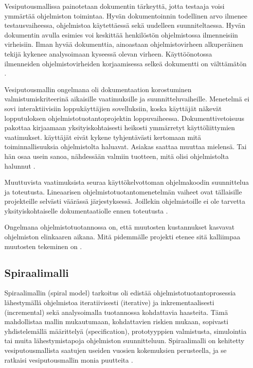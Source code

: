 \documentclass[finnish]{tktltiki2}
\theoremstyle{definition}
\theoremstyle{remark}
\begin{document}
Vesiputousmallissa painotetaan dokumentin tärkeyttä, jotta testaaja voisi ymmärtää ohjelmiston toimintaa. Hyvän dokumentoinnin todellinen arvo ilmenee testausvaiheessa, ohjelmistoa käytettäessä sekä uudelleen suunniteltaessa. Hyvän dokumentin avulla esimies voi keskittää henkilöstön ohjelmistossa ilmenneisiin virheisiin. Ilman hyvää dokumenttia, ainoastaan ohjelmistovirheen alkuperäinen tekijä kykenee analysoimaan kyseessä olevan virheen. Käyttöönotossa ilmenneiden ohjelmistovirheiden korjaamisessa selkeä dokumentti on välttämätön \cite{ROY70}.

Vesiputousmallin ongelmana oli dokumentaation korostuminen valmistumiskriteerinä aikaisille vaatimuksille ja suunnitteluvaiheille. Menetelmä ei sovi interaktiivisiin loppukäyttäjien sovelluksiin, koska käyttäjät näkevät lopputuloksen ohjelmistotuotantoprojektin loppuvaiheessa. Dokumenttivetoisuus pakottaa kirjaamaan yksityiskohtaisesti heikosti ymmärretyt käyttö\-liittymien vaatimukset. käyttäjät eivät kykene tyhjentävästi kertomaan mitä toiminnallisuuksia ohjelmistolta haluavat. Asiakas saattaa muuttaa mielensä. Tai hän osaa usein sanoa, nähdessään valmiin tuotteen, mitä olisi ohjelmistolta halunnut \cite{BEC99}.

Muuttuvista vaatimuksista seuraa käyttökelvottoman ohjelmakoodin suunnittelua ja toteutusta. Lineaarisen ohjelmistotuotantomenetelmän vaiheet ovat tällaisille projekteille selvästi väärässä järjestyksessä. Joillekin ohjelmistoille ei ole tarvetta yksityiskohtaiselle dokumentaatiolle ennen toteutusta \cite{BOE88}.

Ongelmana ohjelmistotuotannossa on, että muutosten kustannukset kasvavat ohjelmiston elinkaaren aikana. Mitä pidemmälle projekti etenee sitä kalliimpaa muutosten tekeminen on \cite{HIC01}.


\subsection{Spiraalimalli}

Spiraalimallin (spiral model) tarkoitus oli edistää ohjelmistotuotantoprosessia lähestymällä ohjelmistoa iteratiivisesti (iterative) ja inkrementaalisesti (incremental) sekä analysoimalla tuotannossa kohdattavia haasteita. Tämä mahdollistaa mallin mukautumaan, kohdattavien riskien mukaan, sopivasti yhdistelemällä määrittelyä (specification), prototyyppien valmistusta, simulointia tai muita lähestymistapoja ohjelmiston suunnitteluun. Spiraalimalli on kehitetty vesiputousmallista saatujen useiden vuosien kokemuksien perusteella, ja se ratkaisi vesiputousmallin monia puutteita \cite{BOE88}.
\end{document}
